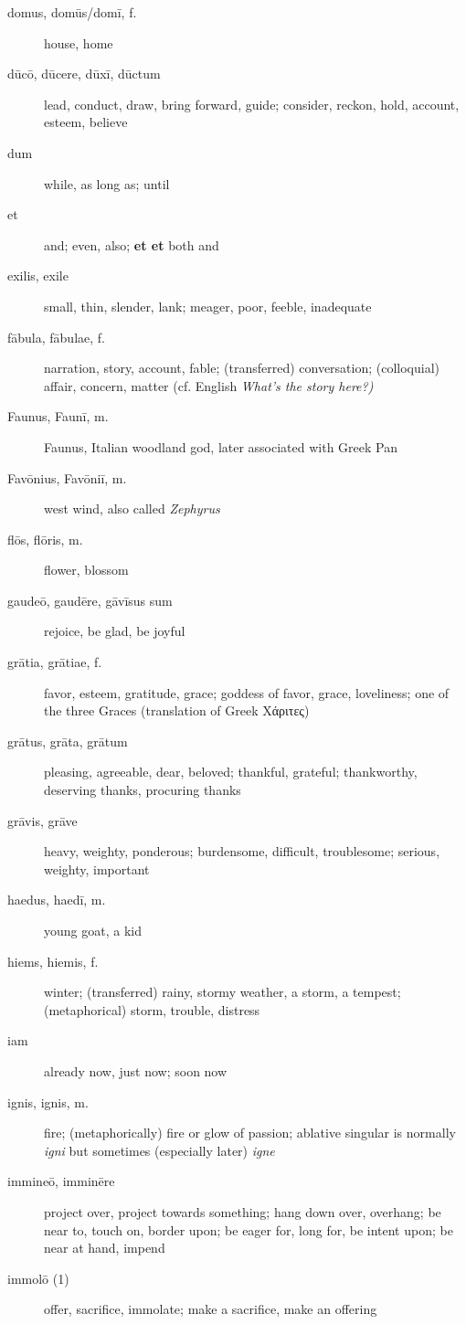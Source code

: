 \begin{description}
    \item[domus, domūs/domī, f.] house, home
    \item[dūcō, dūcere, dūxī, dūctum] lead, conduct, draw, bring forward, guide; consider, reckon, hold, account, esteem, believe
    \item[dum] while, as long as; until
    \item[et] and; even, also; \textbf{et \lips et} both \lips and
    \item[exilis, exile] small, thin, slender, lank; meager, poor, feeble, inadequate
    \item[fābula, fābulae, f.] narration, story, account, fable; (transferred) conversation; (colloquial) affair, concern, matter (cf. English \textit{What's the story here?)}
    \item[Faunus, Faunī, m.] Faunus, Italian woodland god, later associated with Greek Pan
    \item[Favōnius, Favōniī, m.] west wind, also called \textit{Zephyrus}
    \item[flōs, flōris, m.] flower, blossom
    \item[gaudeō, gaudēre, gāvīsus sum] rejoice, be glad, be joyful
    \item[grātia, grātiae, f.] favor, esteem, gratitude, grace; goddess of favor, grace, loveliness; one of the three Graces (translation of Greek Χάριτες)
    \item[grātus, grāta, grātum] pleasing, agreeable, dear, beloved; thankful, grateful; thankworthy, deserving thanks, procuring thanks
    \item[grāvis, grāve] heavy, weighty, ponderous; burdensome, difficult, troublesome; serious, weighty, important
    \item[haedus, haedī, m.] young goat, a kid
    \item[hiems, hiemis, f.] winter; (transferred) rainy, stormy weather, a storm, a tempest; (metaphorical) storm, trouble, distress 
    \item[iam] already now, just now; soon now
    \item[ignis, ignis, m.] fire; (metaphorically) fire or glow of passion; ablative singular is normally \textit{igni} but sometimes (especially later) \textit{igne} 
    \item[immineō, imminēre] project over, project towards something; hang down over, overhang; be near to, touch on, border upon; be eager for, long for, be intent upon; be near at hand, impend
    \item[immolō (1)] offer, sacrifice, immolate; make a sacrifice, make an offering

\end{description}
